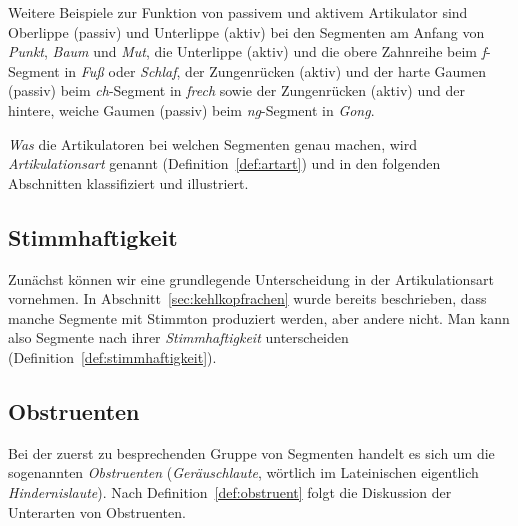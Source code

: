 Weitere Beispiele zur Funktion von passivem und aktivem Artikulator sind Oberlippe (passiv) und Unterlippe (aktiv) bei den Segmenten am Anfang von \textit{Punkt}, \textit{Baum} und \textit{Mut}, die Unterlippe (aktiv) und die obere Zahnreihe beim \textit{f}-Segment in \textit{Fuß} oder \textit{Schlaf}, der Zungenrücken (aktiv) und der harte Gaumen (passiv) beim \textit{ch}-Segment in \textit{frech} sowie der Zungenrücken (aktiv) und der hintere, weiche Gaumen (passiv) beim \textit{ng}-Segment in \textit{Gong}.

\Np

\textit{Was} die Artikulatoren bei welchen Segmenten genau machen, wird \textit{Artikulationsart} genannt (Definition~\ref{def:artart}) und in den folgenden Abschnitten klassifiziert und illustriert.

\Stretch[0.5]


\Stretch[0.75]

\subsection{Stimmhaftigkeit}

\label{sec:stimmhaftigkeit}

Zunächst können wir eine grundlegende Unterscheidung in der Artikulationsart vornehmen.
In Abschnitt~\ref{sec:kehlkopfrachen} wurde bereits beschrieben, dass manche Segmente mit Stimmton produziert werden, aber andere nicht.
Man kann also Segmente nach ihrer \textit{Stimmhaftigkeit} unterscheiden (Definition~\ref{def:stimmhaftigkeit}).


\Stretch[0.75]

\subsection{Obstruenten}

\label{sec:obstruenten}

Bei der zuerst zu besprechenden Gruppe von Segmenten handelt es sich um die sogenannten \textit{Obstruenten} (\textit{Geräuschlaute}, wörtlich im Lateinischen eigentlich \textit{Hindernislaute}).
Nach Definition~\ref{def:obstruent} folgt die Diskussion der Unterarten von Obstruenten.

